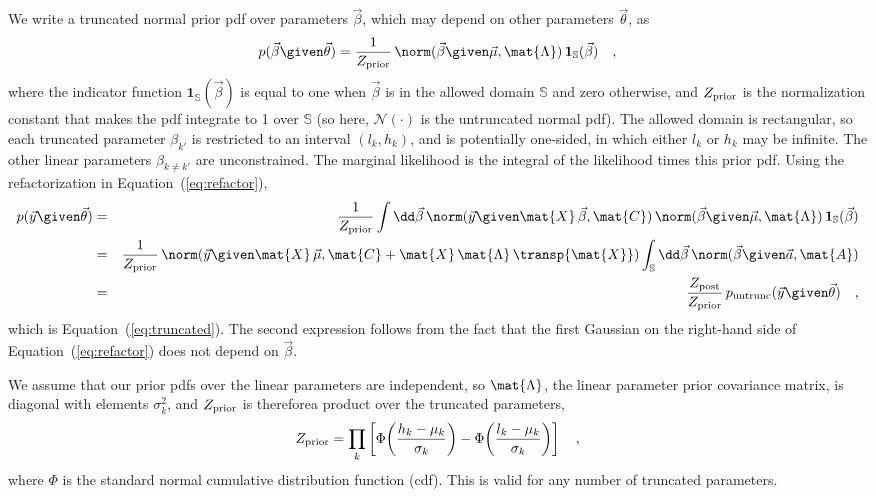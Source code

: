 \documentclass[twocolumn]{AASTeX7/aastex701}
\begin{document}
We write a truncated normal prior pdf over parameters $\vec{\beta}$, which may depend on
other parameters $\vec{\theta}$, as
\begin{equation}
  p(\vec{\beta} \given \vec{\theta}) = \frac{1}{Z_{\rm prior}} \,
    \norm(\vec{\beta} \given \vec{\mu}, \mat{\Lambda}) \, \mathbf{1}_\mathbb{S}(\vec{\beta})
  \quad ,
\end{equation}
where the indicator function $\mathbf{1}_\mathbb{S}(\vec{\beta})$ is equal to one when
$\vec{\beta}$ is in the allowed domain $\mathbb{S}$ and zero otherwise, and
$Z_{\rm prior}$ is the normalization constant that makes the pdf integrate to 1 over
$\mathbb{S}$ (so here, $\mathcal{N}(\cdot)$ is the untruncated normal pdf).
The allowed domain is rectangular, so each truncated parameter
$\beta_{k'}$ is restricted to an interval $(l_k, h_k)$, and is potentially one-sided, in
which either $l_k$ or $h_k$ may be infinite.
The other linear parameters $\beta_{k\neq k'}$ are unconstrained.
The marginal likelihood is the integral of the likelihood times this prior pdf.
Using the refactorization in Equation~(\ref{eq:refactor}),
\begin{eqnarray}
  p(\vec{y} \given \vec{\theta})
  &=& \frac{1}{Z_{\rm prior}} \int \dd\vec{\beta} \,
    \norm(\vec{y} \given \mat{X}\,\vec{\beta}, \mat{C}) \,
    \norm(\vec{\beta} \given \vec{\mu}, \mat{\Lambda}) \, \mathbf{1}_\mathbb{S}(\vec{\beta}) \\
  &=& \frac{1}{Z_{\rm prior}} \,
    \norm(\vec{y} \given \mat{X}\,\vec{\mu},
      \mat{C} + \mat{X}\,\mat{\Lambda}\,\transp{\mat{X}})
    \int_{\mathbb{S}} \dd\vec{\beta} \, \norm(\vec{\beta} \given \vec{a}, \mat{A}) \\
  &=& \frac{Z_{\rm post}}{Z_{\rm prior}} \,
    p_{\rm untrunc}(\vec{y} \given \vec{\theta})
  \quad ,
\end{eqnarray}
which is Equation~(\ref{eq:truncated}).
The second expression follows from the fact that the first Gaussian on the right-hand
side of Equation~(\ref{eq:refactor}) does not depend on $\vec{\beta}$.

We assume that our prior pdfs over the linear parameters are independent, so
$\mat{\Lambda}$, the linear parameter prior covariance matrix, is diagonal with elements
$\sigma_k^2$, and $Z_{\rm prior}$ is thereforea product over the truncated parameters,
\begin{equation}
  Z_{\rm prior} = \prod_k \left[
    \Phi\!\left(\frac{h_k - \mu_k}{\sigma_k}\right)
    - \Phi\!\left(\frac{l_k - \mu_k}{\sigma_k}\right) \right]
  \quad ,
\end{equation}
where $\Phi$ is the standard normal cumulative distribution function (cdf).
This is valid for any number of truncated parameters.
\end{document}
